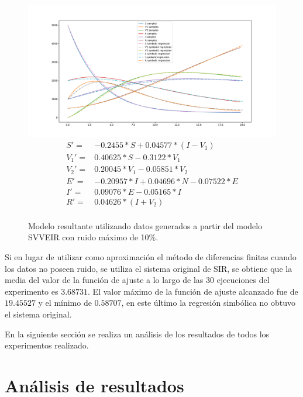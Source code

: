 \begin{figure}[h]
    \centering
    \includegraphics[width=\textwidth]{"figures/final_plot_SVVEIR_0.1.pdf"}
    \begin{align*}
        S' =   & -0.2455 * S + 0.04577 * (I - V_1)       \\
        V_1' = & 0.40625 * S -0.3122 * V_1               \\
        V_2' = & 0.20045 * V_1 -0.05851 * V_2            \\
        E' =   & -0.20957 * I + 0.04696 * N -0.07522 * E \\
        I' =   & 0.09076 * E -0.05165 * I                \\
        R' =   & 0.04626 * (I + V_2)                     \\
    \end{align*}
    \caption{Modelo resultante utilizando datos generados a partir del modelo SVVEIR con ruido máximo de 10\%.}
    \label{fig:final_plot_SVVEIR_0.1}
\end{figure}

Si en lugar de utilizar como aproximación el método de diferencias finitas cuando los datos no poseen ruido, se utiliza el sistema original de SIR, se obtiene que la media del valor de la función de ajuste a lo largo de las 30 ejecuciones del experimento es $3.68731$. El valor máximo de la función de ajuste alcanzado fue de $19.45527$ y el mínimo de $0.58707$, en este último la regresión simbólica no obtuvo el sistema original.

En la siguiente sección se realiza un análisis de los resultados de todos los experimentos realizado.

\section{Análisis de resultados}\label{section:experiments_results}

